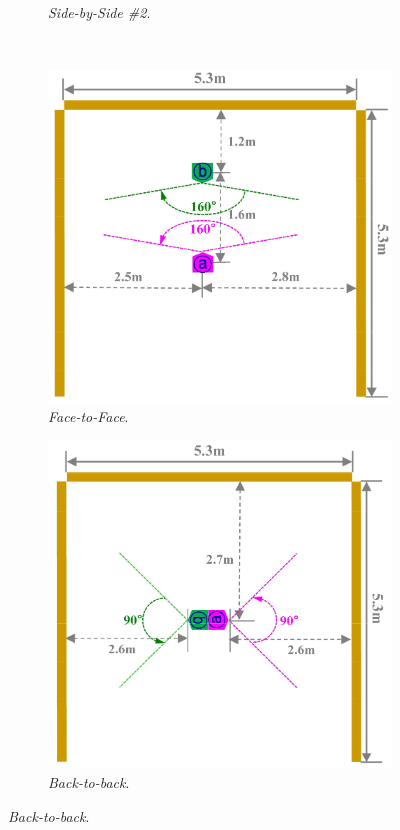 \begin{figure}[!ht]
\begin{subfigure}[c]{0.45\textwidth}
		\caption{\textit{Side-by-Side \#2}.}
		\label{fig:kim-side-by-side-2}
	\end{subfigure}
	\\ \vspace{4mm}
	\centering
	\begin{subfigure}[c]{0.45\textwidth}
		\includegraphics[width=\textwidth]{img/lidar-interference/kim-setup-face-to-face.png}
		\caption{\textit{Face-to-Face}.}
		\label{fig:kim-face-to-face}
	\end{subfigure}
	\quad
	\begin{subfigure}[c]{0.45\textwidth}
		\includegraphics[width=\textwidth]{img/lidar-interference/kim-setup-back-to-back.png}
		\caption{\textit{Back-to-back}.}
		\label{fig:kim-back-to-back}
	\end{subfigure}


\end{figure}
